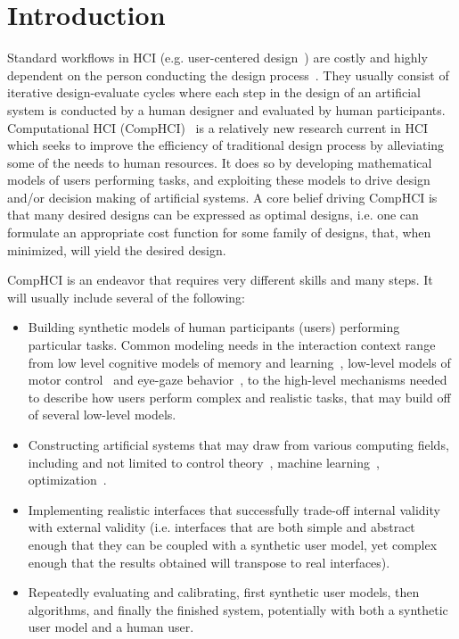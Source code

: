 \documentclass[12pt,a4paper]{article}
\begin{document}
\section{Introduction}
Standard workflows in HCI (e.g. user-centered design~\cite{abras2004}) are costly and highly dependent on the person conducting the design process~\cite{liao2021}.
They usually consist of iterative design-evaluate cycles where each step in the design of an artificial system is conducted by a human designer and evaluated by human participants.
Computational HCI (CompHCI)~\cite{oulasvirta2018} is a relatively new research current in HCI which seeks to improve the efficiency of traditional design process by alleviating some of the needs to human resources. It does so by developing mathematical models of users performing tasks, and exploiting these models to drive design and/or decision making of artificial systems.
A core belief driving CompHCI is that many desired designs can be expressed as optimal designs, i.e. one can formulate an appropriate cost function for some family of designs, that, when minimized, will yield the desired design.


CompHCI is an endeavor that requires very different skills and many steps. It will usually include several of the following:
	\begin{itemize}
		\item Building synthetic models of human participants (users) performing particular tasks. Common modeling needs in the interaction context range from low level cognitive models of memory and learning~\cite{nioche2021}, low-level models of motor control~\cite{gori2020} and eye-gaze behavior~\cite{chen2021}, to the high-level mechanisms needed to describe how users perform complex and realistic tasks, that may build off of several low-level models. 

		
		\item Constructing artificial systems that may draw from various computing fields, including and not limited to control theory~\cite{ziebart2012, langerak2020}, machine learning~\cite{koch2019, nioche2021}, optimization~\cite{oulasvirta2020}. 
		
		\item Implementing realistic interfaces that successfully trade-off internal validity with external validity (i.e. interfaces that are both simple and abstract enough that they can be coupled with a synthetic user model, yet complex enough that the results obtained will transpose to real interfaces). 
		
		\item Repeatedly evaluating and calibrating, first synthetic user models, then algorithms, and finally the finished system, potentially with both a synthetic user model and a human user. 

	\end{itemize}
\end{document}
